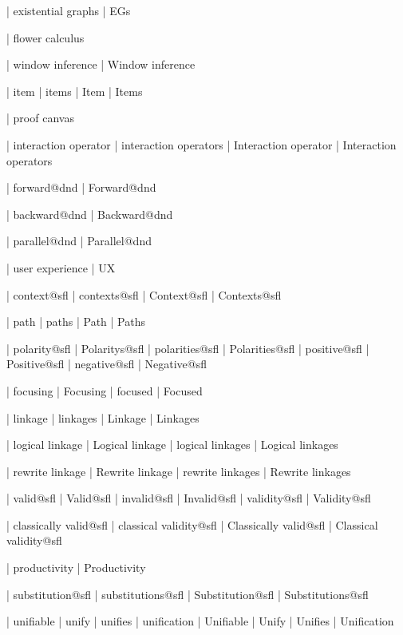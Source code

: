  | existential graphs
 | EGs

 | flower calculus
 
 | window inference
 | Window inference


 | item
 | items
 | Item
 | Items

 | proof canvas

 | interaction operator
 | interaction operators
 | Interaction operator
 | Interaction operators

 | forward@dnd
 | Forward@dnd

 | backward@dnd
 | Backward@dnd

 | parallel@dnd
 | Parallel@dnd


 | user experience
 | UX
 
 | context@sfl
 | contexts@sfl
 | Context@sfl
 | Contexts@sfl

 | path
 | paths
 | Path
 | Paths

 | polarity@sfl
 | Polaritys@sfl
 | polarities@sfl
 | Polarities@sfl
 | positive@sfl
 | Positive@sfl
 | negative@sfl
 | Negative@sfl

 | focusing
 | Focusing
 | focused
 | Focused

 | linkage
 | linkages
 | Linkage
 | Linkages

 | logical linkage
 | Logical linkage
 | logical linkages
 | Logical linkages

 | rewrite linkage
 | Rewrite linkage
 | rewrite linkages
 | Rewrite linkages

 | valid@sfl
 | Valid@sfl
 | invalid@sfl
 | Invalid@sfl
 | validity@sfl
 | Validity@sfl

 | classically valid@sfl
 | classical validity@sfl
 | Classically valid@sfl
 | Classical validity@sfl

 | productivity
 | Productivity
 
 | substitution@sfl
 | substitutions@sfl
 | Substitution@sfl
 | Substitutions@sfl

 | unifiable
 | unify
 | unifies
 | unification
 | Unifiable
 | Unify
 | Unifies
 | Unification

